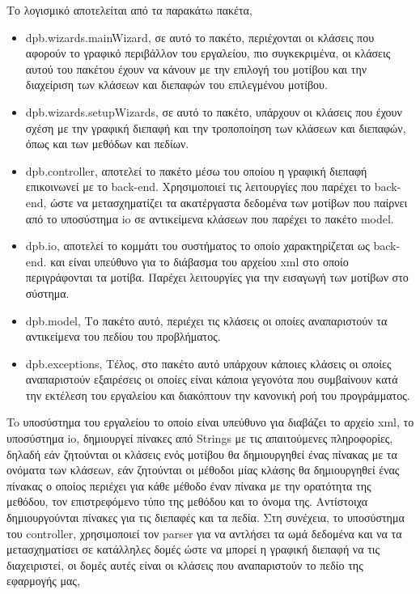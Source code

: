 Το λογισμικό αποτελείται από τα παρακάτω πακέτα,
\begin{itemize}
    \item dpb.wizards.mainWizard, σε αυτό το πακέτο, περιέχονται οι κλάσεις που αφορούν το γραφικό περιβάλλον του εργαλείου,
     πιο συγκεκριμένα, οι κλάσεις αυτού του πακέτου έχουν να κάνουν με την επιλογή του μοτίβου και την διαχείριση των κλάσεων και διεπαφών του 
     επιλεγμένου μοτίβου.
    \item dpb.wizards.setupWizards, σε αυτό το πακέτο, υπάρχουν οι κλάσεις που έχουν σχέση με την γραφική διεπαφή και την τροποποίηση των κλάσεων και διεπαφών, 
    όπως και των μεθόδων και πεδίων.
    \item dpb.controller, αποτελεί το πακέτο μέσω του οποίου η γραφική διεπαφή επικοινωνεί με το back-end. Χρησιμοποιεί τις λειτουργίες που παρέχει το back-end, 
    ώστε να  μετασχηματίζει τα ακατέργαστα δεδομένα των μοτίβων που παίρνει από το υποσύστημα io σε αντικείμενα κλάσεων που παρέχει το πακέτο model.
    \item dpb.io, αποτελεί το κομμάτι του συστήματος το οποίο χαρακτηρίζεται ως back-end.
     και είναι υπεύθυνο για το διάβασμα του αρχείου xml στο οποίο περιγράφονται τα μοτίβα. 
     Παρέχει λειτουργίες για την εισαγωγή των μοτίβων στο σύστημα.
    \item dpb.model, Το πακέτο αυτό, περιέχει τις κλάσεις οι οποίες αναπαριστούν τα αντικείμενα του πεδίου του προβλήματος.
    \item dpb.exceptions, Τέλος, στο πακέτο αυτό υπάρχουν κάποιες κλάσεις οι οποίες αναπαριστούν εξαιρέσεις 
        οι οποίες είναι κάποια γεγονότα που συμβαίνουν κατά την εκτέλεση του εργαλείου και διακόπτουν την κανονική ροή του προγράμματος.
\end{itemize}
To υποσύστημα του εργαλείου το οποίο είναι υπεύθυνο για διαβάζει το αρχείο xml, το υποσύστημα io, 
δημιουργεί πίνακες από Strings με τις απαιτούμενες πληροφορίες, δηλαδή εάν ζητούνται οι κλάσεις ενός μοτίβου 
θα δημιουργηθεί ένας πίνακας με τα ονόματα των κλάσεων, εάν ζητούνται οι μέθοδοι μίας κλάσης θα δημιουργηθεί ένας πίνακας 
ο οποίος περιέχει για κάθε μέθοδο έναν πίνακα με την ορατότητα της μεθόδου, τον επιστρεφόμενο τύπο της μεθόδου και το όνομα της. 
Αντίστοιχα δημιουργούνται πίνακες για τις διεπαφές και τα πεδία. Στη συνέχεια, το υποσύστημα του controller, 
χρησιμοποιεί τον parser για να αντλήσει τα ωμά δεδομένα και να τα μετασχηματίσει σε κατάλληλες δομές ώστε να μπορεί 
η γραφική διεπαφή να τις διαχειριστεί, οι δομές αυτές είναι οι κλάσεις που αναπαριστούν το πεδίο της εφαρμογής μας, 
